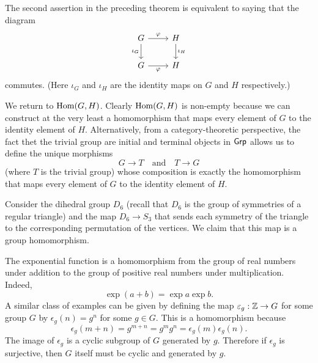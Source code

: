 \begin{remark}
    The second assertion in the preceding theorem is equivalent to saying that
    the diagram
    \[
        \begin{tikzcd}
            G \arrow{r}{\phi} \arrow[swap]{d}{\iota_G} & H \arrow{d}{\iota_H} \\
            G \arrow[swap]{r}{\phi} & H
        \end{tikzcd}
    \]
    commutes. (Here \(\iota_G\) and \(\iota_H\) are the identity maps on \(G\)
    and \(H\) respectively.)
\end{remark}

\begin{example}
    We return to \(\operatorname{Hom}(G, H)\). Clearly \(\operatorname{Hom}(G, H)\) is non-empty because we
    can construct at the very least a homomorphism that maps every element of
    \(G\) to the identity element of \(H\). Alternatively, from a
    category-theoretic perspective, the fact thet the trivial group are initial
    and terminal objects in \(\mathsf{Grp}\) allows us to define the unique morphisms
    \[
        G \to T \quad \text{and} \quad T \to G
    \]
    (where \(T\) is the trivial group) whose composition is exactly the
    homomorphism that maps every element of \(G\) to the identity element of
    \(H\).
\end{example}

\begin{example}
    Consider the dihedral group \(D_6\) (recall that \(D_6\) is the group of
    symmetries of a regular triangle) and the map \(D_6 \to S_3\) that sends
    each symmetry of the triangle to the corresponding permutation of the
    vertices. We claim that this map is a group homomorphism.
\end{example}

\begin{example}
    The exponential function is a homomorphism from the group of real numbers
    under addition to the group of positive real numbers under multiplication.
    Indeed,
    \[
        \exp (a + b) = \exp a \exp b.
    \]
    A similar class of examples can be given by defining the map \(\varepsilon_g :
    \mathbb{Z} \to G\) for some group \(G\) by \(\epsilon_g(n) = g^n\) for some \(g \in
    G\). This is a homomorphism because
    \[
        \epsilon_g(m + n) = g^{m + n} = g^m g^n = \epsilon_g(m) \epsilon_g(n).
    \]
    The image of \(\epsilon_g\) is a cyclic subgroup of \(G\) generated by
    \(g\). Therefore if \(\epsilon_g\) is surjective, then \(G\) itself must be
    cyclic and generated by \(g\).
\end{example}

